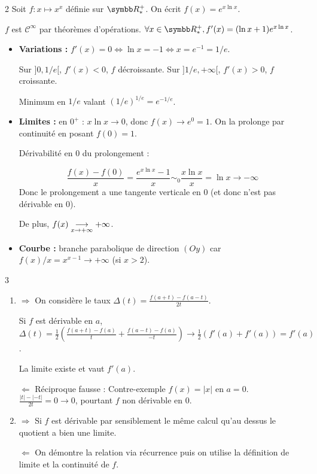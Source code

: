 \begin{correction}{2}
    Soit $f : x \mapsto x^x$ définie sur $\R^+_*$.
    On écrit $f(x) = e^{x \ln x}$.

    $f$ est $\mathcal{C}^{\infty}$ par théorèmes d'opérations.
    $\forall x \in \R^+_*, f'(x) = (\ln x + 1) e^{x \ln x}$.

    \begin{itemize}
    \item 
        \textbf{Variations :}
        $f'(x) = 0 \iff \ln x = -1 \iff x = e^{-1} = 1/e$.

        Sur $]0, 1/e[$, $f'(x) < 0$, $f$ décroissante.
        Sur $]1/e, +\infty[$, $f'(x) > 0$, $f$ croissante.

        Minimum en $1/e$ valant $(1/e)^{1/e} = e^{-1/e}$.
    \item
        \textbf{Limites :}
        en $0^+$ : $x \ln x \to 0$, donc $f(x) \to e^0 = 1$.
        On la prolonge par continuité en posant $f(0)=1$.
        
        Dérivabilité en 0 du prolongement :

        \[\frac{f(x)-f(0)}{x} = \frac{e^{x \ln x}-1}{x} \sim_{0} \frac{x \ln x}{x} = \ln x \to -\infty \]
        Donc le prolongement a une tangente verticale en $0$ (et donc n'est pas dérivable en $0$).

        De plus, $f(x) \underset{x \to +\infty}{\longrightarrow} +\infty$.
    \item
        \textbf{Courbe :} branche parabolique de direction $(Oy)$ car $f(x)/x = x^{x-1} \to + \infty$ (si $x>2$).
    \end{itemize}
\end{correction}

\begin{correction}{3}
\begin{enumerate}
    \item $\Rightarrow$ On considère le taux $\Delta(t) = \frac{f(a+t)-f(a-t)}{2t}$.

        Si $f$ est dérivable en $a$, $\Delta(t) = \frac{1}{2} (\frac{f(a+t)-f(a)}{t} + \frac{f(a-t)-f(a)}{-t}) \to \frac{1}{2}(f'(a)+f'(a)) = f'(a)$.

        La limite existe et vaut $f'(a)$.

        $\Leftarrow$ Réciproque fausse : Contre-exemple $f(x)=|x|$ en $a=0$.
        $\frac{|t|-|-t|}{2t} = 0 \to 0$, pourtant $f$ non dérivable en 0.

    \item
    $\Rightarrow$ Si $f$ est dérivable par sensiblement le même calcul qu'au dessus le quotient a bien une limite.

    $\Leftarrow$ On démontre la relation via récurrence puis on utilise la définition de limite et la continuité de $f$.
\end{enumerate}
\end{correction}


